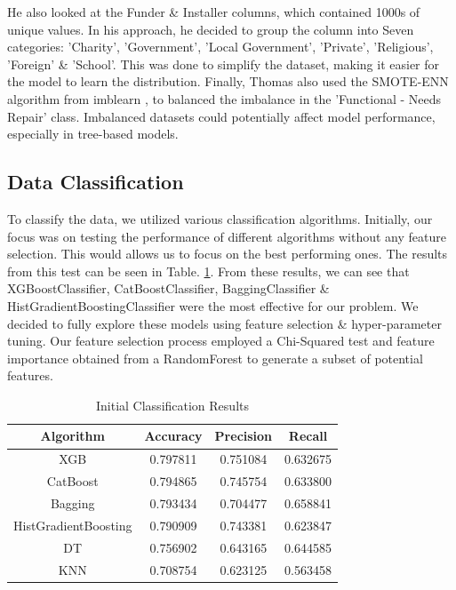 \documentclass[conference]{IEEEtran}
\begin{document}
He also looked at the Funder \& Installer columns, which contained 1000s of unique values. In his approach, he decided to group the column into Seven categories: 'Charity', 'Government', 'Local Government', 'Private', 'Religious', 'Foreign' \& 'School'. This was done to simplify the dataset, making it easier for the model to learn the distribution. Finally, Thomas also used the SMOTE-ENN algorithm from imblearn \cite{smote-enn}, to balanced the imbalance in the 'Functional - Needs Repair' class. Imbalanced datasets could potentially affect model performance, especially in tree-based models.


\subsection{Data Classification}

 To classify the data, we utilized various classification algorithms. Initially, our focus was on testing the performance of different algorithms without any feature selection. This would allows us to focus on the best performing ones. The results from this test can be seen in Table. \ref{tab:initial-clf-results}. From these results, we can see that XGBoostClassifier, CatBoostClassifier, BaggingClassifier \& HistGradientBoostingClassifier were the most effective for our problem. We decided to fully explore these models using feature selection \& hyper-parameter tuning. Our feature selection process employed a Chi-Squared test and feature importance obtained from a RandomForest to generate a subset of potential features.

\begin{table}[h]
  \centering
  \caption{Initial Classification Results}
  \label{tab:initial-clf-results}
  \begin{tabular}{|c|c|c|c|}
    \hline
    \textbf{Algorithm} & \textbf{Accuracy} & \textbf{Precision} & \textbf{Recall} \\ \hline
    XGB	& 0.797811 & 0.751084 & 0.632675 \\
    \hline
    CatBoost & 0.794865 & 0.745754 & 0.633800 \\
    \hline
    Bagging & 0.793434 & 0.704477 & 0.658841 \\
    \hline
    HistGradientBoosting & 0.790909 & 0.743381 & 0.623847 \\
    \hline
    DT & 0.756902 & 0.643165 & 0.644585 \\
    \hline
    KNN & 0.708754 & 0.623125 & 0.563458 \\
    \hline
  \end{tabular}
\end{table}
\end{document}
